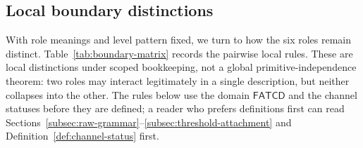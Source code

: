 \documentclass[11pt]{article}
\theoremstyle{definition}
\newcommand{\FATCD}{\ensuremath{\mathsf{FATCD}}}
\begin{document}
\subsection{Local boundary distinctions}\label{subsec:boundary-matrix}

With role meanings and level pattern fixed, we turn to how the six
roles remain distinct. Table~\ref{tab:boundary-matrix} records the
pairwise local rules. These are local distinctions under scoped
bookkeeping, not a global primitive-independence theorem: two roles
may interact legitimately in a single description, but neither
collapses into the other. The rules below use the domain \FATCD{} and the
channel statuses before they are defined; a reader who prefers definitions
first can read Sections~\ref{subsec:raw-grammar}--\ref{subsec:threshold-attachment}
and Definition~\ref{def:channel-status} first.
\end{document}
